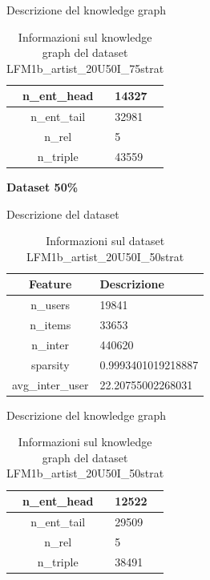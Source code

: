 \noindent Descrizione del knowledge graph
\begin{table}[H]
    \centering
    \footnotesize
    \begin{tabularx}{\textwidth}{|c|X|}
        \hline
        n\_ent\_head & 14327 \\
        \hline
        n\_ent\_tail & 32981 \\
        \hline
        n\_rel & 5 \\
        \hline
        n\_triple & 43559 \\
        \hline
    \end{tabularx}
    \caption{Informazioni sul knowledge graph del dataset LFM1b\_artist\_20U50I\_75strat}
    \label{tab:dataset_info}
\end{table}

\noindent\textbf{Dataset 50\%}

\noindent Descrizione del dataset
\begin{table}[H]
    \centering
    \footnotesize
    \begin{tabularx}{\textwidth}{|c|X|}
        \hline
        \textbf{Feature} & \textbf{Descrizione} \\
        \hline
        n\_users & 19841 \\
        \hline
        n\_items & 33653 \\
        \hline
        n\_inter & 440620 \\
        \hline
        sparsity &  0.9993401019218887 \\
        \hline
        avg\_inter\_user & 22.20755002268031 \\
        \hline
    \end{tabularx}
    \caption{Informazioni sul dataset LFM1b\_artist\_20U50I\_50strat}
    \label{tab:dataset_info}
\end{table}


\noindent Descrizione del knowledge graph
\begin{table}[H]
    \centering
    \footnotesize
    \begin{tabularx}{\textwidth}{|c|X|}
        \hline
        n\_ent\_head & 12522 \\
        \hline
        n\_ent\_tail & 29509 \\
        \hline
        n\_rel & 5 \\
        \hline
        n\_triple & 38491 \\
        \hline
    \end{tabularx}
    \caption{Informazioni sul knowledge graph del dataset LFM1b\_artist\_20U50I\_50strat}
    \label{tab:dataset_info}
\end{table}

